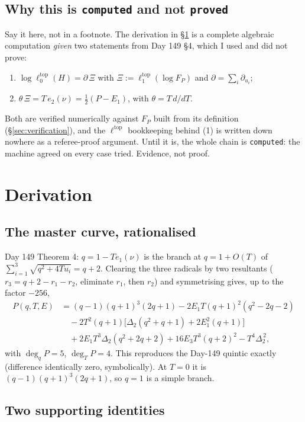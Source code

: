 \documentclass[11pt,a4paper]{article}
\newcommand{\ltop}{\ell^{\mathrm{top}}}
\theoremstyle{plain}
\theoremstyle{definition}
\begin{document}
\subsection*{Why this is \texttt{computed} and not \texttt{proved}}
\label{sec:grade-caveat}

Say it here, not in a footnote. The derivation in \S\ref{sec:derivation} is a complete
algebraic computation \emph{given} two statements from Day 149 \S4, which I used and did
not prove:
\begin{enumerate}
\item $\log\ltop_0(H)=\partial\,\Xi$ with $\Xi:=\ltop_1(\log F_P)$ and
      $\partial=\sum_i\partial_{u_i}$;
\item $\theta\,\Xi=T\,e_2(\nu)=\tfrac12(P-E_1)$, with $\theta=T\,d/dT$.
\end{enumerate}
Both are verified numerically against $F_P$ built from its definition
(\S\ref{sec:verification}), and the $\ltop$ bookkeeping behind (1) is written down nowhere
as a referee-proof argument. Until it is, the whole chain is \texttt{computed}: the machine
agreed on every case tried. Evidence, not proof.

\section{Derivation}
\label{sec:derivation}

\subsection{The master curve, rationalised}

Day 149 Theorem 4: $q=1-Te_1(\nu)$ is the branch at $q=1+O(T)$ of
$\sum_{i=1}^3\sqrt{q^2+4Tu_i}=q+2$. Clearing the three radicals by two resultants
($r_3=q+2-r_1-r_2$, eliminate $r_1$, then $r_2$) and symmetrising gives, up to the factor
$-256$,
\begin{align*}
P(q,T,E)&=(q-1)(q+1)^3(2q+1)-2E_1T(q+1)^2(q^2-2q-2)\\
&\quad-2T^2(q+1)\bigl[\Delta_2(q^2+q+1)+2E_1^2(q+1)\bigr]\\
&\quad+2E_1T^3\Delta_2(q^2+2q+2)+16E_3T^3(q+2)^2-T^4\Delta_2^{\,2},
\end{align*}
with $\deg_qP=5$, $\deg_TP=4$. This reproduces the Day-149 quintic exactly (difference
identically zero, symbolically). At $T=0$ it is $(q-1)(q+1)^3(2q+1)$, so $q=1$ is a simple
branch.

\subsection{Two supporting identities}
\end{document}
